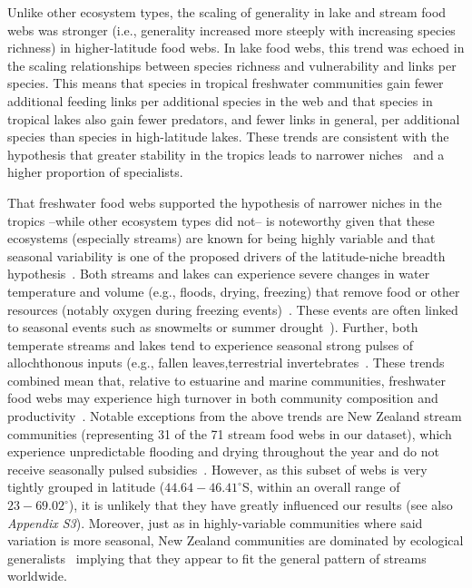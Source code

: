 \documentclass[12pt]{article}
\begin{document}
  Unlike other ecosystem types, the scaling of generality in lake and stream
  food webs was stronger (i.e., generality increased more steeply with
  increasing species richness) in higher-latitude food webs. In lake food webs,
  this trend was echoed in the scaling relationships between species richness
  and vulnerability and links per species. This means that species in tropical
  freshwater communities gain fewer additional feeding links per additional
  species in the web and that species in tropical lakes also gain fewer
  predators, and fewer links in general, per additional species than species
  in high-latitude lakes. These trends are consistent with the hypothesis that
  greater stability in the tropics leads to narrower niches~\cite{Vazquez2004}
  and a higher proportion of specialists. 


  That freshwater food webs supported the hypothesis of narrower niches in the
  tropics --while other ecosystem types did not-- is noteworthy given that
  these ecosystems (especially streams) are known for being highly variable
  and that seasonal variability is one of the proposed drivers of the
  latitude-niche breadth hypothesis~\cite{Vazquez2004}. Both streams and lakes
  can experience severe changes in water temperature and volume (e.g., floods,
  drying, freezing) that remove food or other resources (notably oxygen during
  freezing events)~\cite{Winterbourn1997,Meding2001}. These events are often
  linked to seasonal events such as snowmelts or summer
  drought~\cite{Winterbourn1997}). Further, both temperate streams and lakes
  tend to experience seasonal strong pulses of allochthonous inputs (e.g.,
  fallen leaves,terrestrial
  invertebrates~\cite{Nakano2001,Lennon2004,Zeng2008}. These trends combined
  mean that, relative to estuarine and marine communities, freshwater food 
  webs may experience high turnover in both community composition and 
  productivity~\cite{Tilzer1988,Magalhaes1993,Baird1989}. Notable exceptions from the above
  trends are New Zealand stream communities (representing 31 of the 71 stream
  food webs in our dataset), which experience unpredictable flooding and
  drying throughout the year and do not receive seasonally pulsed
  subsidies~\cite{Winterbourn1997,Winterbourn1981}. However, as this subset of
  webs is very tightly grouped in latitude ($44.64-46.41^{\circ}$S, within an
  overall range of $23-69.02^{\circ}$), it is unlikely that they have greatly
  influenced our results (see also \emph{Appendix S3}). Moreover, just as in
  highly-variable communities where said variation is more seasonal, New
  Zealand communities are dominated by ecological
  generalists~\cite{Winterbourn1997,Winterbourn1981} implying that they appear
  to fit the general pattern of streams worldwide.
\end{document}
